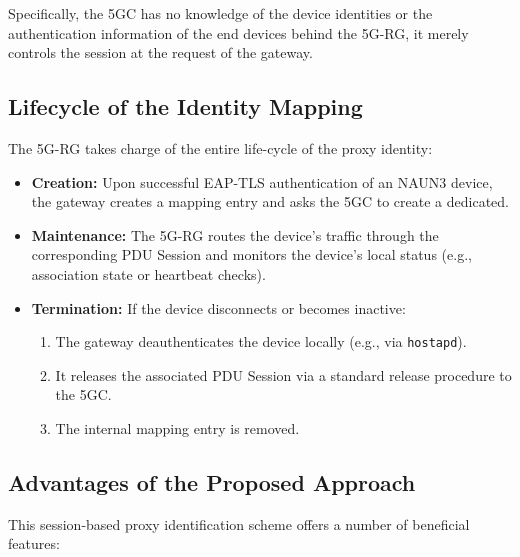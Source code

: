 Specifically, the \ac{5GC} has no knowledge of the device identities or the authentication information of the end devices behind the \ac{5G-RG}, it merely controls the session at the request of the gateway.

\subsection{Lifecycle of the Identity Mapping}

The \ac{5G-RG} takes charge of the entire life-cycle of the proxy identity:

\begin{itemize}
    \item \textbf{Creation:} Upon successful \ac{EAP-TLS} authentication of an \ac{NAUN3} device, the gateway creates a mapping entry and asks the \ac{5GC} to create a dedicated.
    
    \item \textbf{Maintenance:} The \ac{5G-RG} routes the device’s traffic through the corresponding \ac{PDU} Session and monitors the device’s local status (e.g., association state or heartbeat checks).

    \item {
        \textbf{Termination:} If the device disconnects or becomes inactive:
        \begin{enumerate}
            \item The gateway deauthenticates the device locally (e.g., via \texttt{hostapd}).
            \item It releases the associated \ac{PDU} Session via a standard release procedure to the \ac{5GC}.
            \item The internal mapping entry is removed.
        \end{enumerate}
    }
\end{itemize}

\subsection{Advantages of the Proposed Approach}

This session-based proxy identification scheme offers a number of beneficial features:

